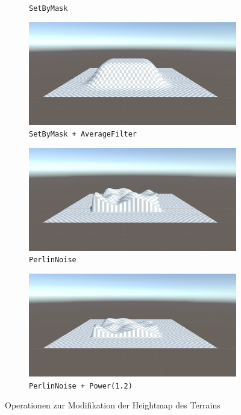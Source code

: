 \begin{figure}
\begin{subfigure}[b]{0.4\textwidth}
        \caption{\texttt{SetByMask}}
    \end{subfigure}
    \hspace{2bp}
    \begin{subfigure}[b]{0.4\textwidth}
        \centering
        \includegraphics[width = \textwidth]{resources/img/wg/wgtmod_setbymask_avg.png}
        \caption{\texttt{SetByMask + AverageFilter}}
    \end{subfigure}\vfill\hfill
    \begin{subfigure}[b]{0.4\textwidth}
        \centering        
        \includegraphics[width = \textwidth]{resources/img/wg/wgtmod_perlin.png}
        \caption{\texttt{PerlinNoise}}
    \end{subfigure}
    \hspace{2bp}
    \begin{subfigure}[b]{0.4\textwidth}
        \centering
        \includegraphics[width = \textwidth]{resources/img/wg/wgtmod_perlin_power.png}
        \caption{\texttt{PerlinNoise + Power(1.2)}}
    \end{subfigure}\hfill
    \caption[Operationen zur Modifikation der Heightmap des Terrains]{Operationen zur Modifikation der Heightmap des Terrains}
    \label{fig:wgtmodex}
\end{figure}

